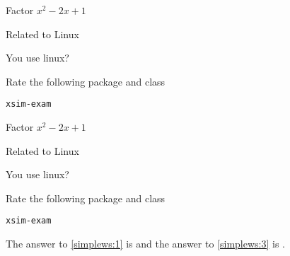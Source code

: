\documentclass{article}
\begin{document}
\begin{enumext}[save-ans=simplews-2,columns=2,check-ans=true,show-pos,nosep,save-ref]
  \item Factor $x^{2}-2x+1$ 
  \item Related to Linux
    \begin{enumext}[nosep,columns*=2]
      \item You use linux? 
      \item Rate the following package and class
        \begin{enumext}
          \item \texttt{xsim-exam} 
        \end{enumext}
    \end{enumext}
\end{enumext}
\stop














\begin{enumext*}[save-ans=simplews,columns=2,check-ans=true,show-pos,nosep,save-ref]
  \item Factor $x^{2}-2x+1$ 
  \item Related to Linux
    \begin{enumext}[nosep,columns*=2]
      \item You use linux? 
      \item Rate the following package and class
        \begin{enumext}[nosep]
          \item \texttt{xsim-exam} 
        \end{enumext}
    \end{enumext}
\end{enumext*}

The answer to \ref{simplews:1} is  and the answer
to \ref{simplews:3} is .

\end{document}
